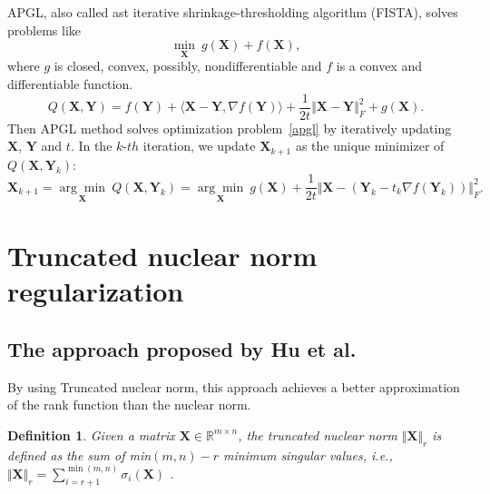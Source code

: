 \documentclass{article}
\newtheorem{definition}{Definition}[section]
\begin{document}
{APGL, also called ast iterative shrinkage-thresholding algorithm (FISTA), solves problems like
\begin{equation}
    \underset{\mathbf X}{\min} \ g(\mathbf X)+f(\mathbf X),
    \label{apgl}
\end{equation}
where $g$ is closed, convex, possibly, nondifferentiable and $f$ is a convex and differentiable function. 
\begin{equation}
    Q(\mathbf X,\mathbf Y) = f(\mathbf Y)+\langle \mathbf X - \mathbf Y, \nabla f(\mathbf Y) \rangle + \frac{1}{2t}\Vert \mathbf X - \mathbf Y \Vert_F^2 +g(\mathbf X).
\end{equation}
Then APGL method solves optimization problem~\eqref{apgl} by iteratively updating $\mathbf X$, $\mathbf Y$ and $t$. In the $k$-$th$ iteration, we update $\mathbf X_{k+1}$ as the unique minimizer of $Q(\mathbf X, \mathbf Y_k)$:
\begin{equation}
    \mathbf X_{k+1} = \underset{\mathbf X}{\arg\min}\ Q(\mathbf X, \mathbf Y_k) = \underset{\mathbf X}{\arg\min}\ g(\mathbf X)+\frac{1}{2t}\Vert \mathbf X- (\mathbf Y_k -t_k \nabla f(\mathbf Y_k))\Vert_F^2.
\end{equation}


\section{Truncated nuclear norm regularization}
\label{s3}

\subsection{The approach proposed by Hu et al.}
By using Truncated nuclear norm, this approach achieves a better approximation of the rank function than the nuclear norm.
\begin{definition}
    Given a matrix $\mathbf X \in \mathbb{R}^{m \times n}$, the truncated nuclear norm $\Vert\mathbf X \Vert_r$ is defined as the sum of min$(m,n) - r$  minimum singular values, i.e., $\Vert\mathbf X \Vert_r = \sum_{i=r+1}^{\min(m,n)} \sigma_i(\mathbf X)$ .
\end{definition}

}
\end{document}

